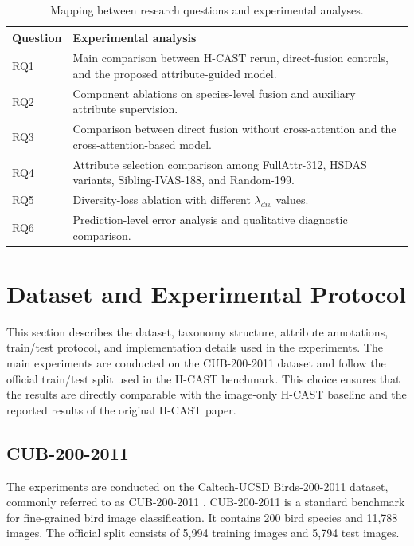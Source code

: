 \begin{table}[t]
    \centering
    \caption{Mapping between research questions and experimental analyses.}
    \label{tab:rq_experiment_mapping}
    \small
    \begin{tabular}{p{2cm}p{10cm}}
        \hline
        \textbf{Question} & \textbf{Experimental analysis} \\
        \hline
        RQ1 & Main comparison between H-CAST rerun, direct-fusion controls, and the proposed attribute-guided model. \\
        RQ2 & Component ablations on species-level fusion and auxiliary attribute supervision. \\
        RQ3 & Comparison between direct fusion without cross-attention and the cross-attention-based model. \\
        RQ4 & Attribute selection comparison among FullAttr-312, HSDAS variants, Sibling-IVAS-188, and Random-199. \\
        RQ5 & Diversity-loss ablation with different \(\lambda_{div}\) values. \\
        RQ6 & Prediction-level error analysis and qualitative diagnostic comparison. \\
        \hline
    \end{tabular}
\end{table}

\section{Dataset and Experimental Protocol}

This section describes the dataset, taxonomy structure, attribute annotations, train/test protocol, and implementation details used in the experiments. The main experiments are conducted on the CUB-200-2011 dataset and follow the official train/test split used in the H-CAST benchmark. This choice ensures that the results are directly comparable with the image-only H-CAST baseline and the reported results of the original H-CAST paper.


\subsection{CUB-200-2011}

The experiments are conducted on the Caltech-UCSD Birds-200-2011 dataset, commonly referred to as CUB-200-2011 \cite{wah2011cub}. CUB-200-2011 is a standard benchmark for fine-grained bird image classification. It contains 200 bird species and 11,788 images. The official split consists of 5,994 training images and 5,794 test images.


